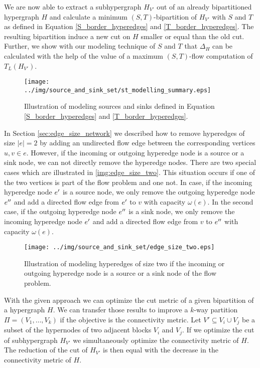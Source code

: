 We are now able to extract a subhypergraph $H_{V'}$ out of an already bipartitioned hypergraph $H$ and
calculate a minimum $(S,T)$-bipartition of $H_{V'}$ with $S$ and $T$ as defined
in Equation \ref{S_border_hyperedges} and \ref{T_border_hyperedges}. The resulting
bipartition induce a new cut on $H$ smaller or equal than the old cut. Further, we show with our
modeling technique of $S$ and $T$ that $\Delta_H$ can be calculated with the help of the value 
of a maximum $(S,T)$-flow computation of $T_L(H_{V'})$. \\
\begin{figure}[ht!]
\centering
\texttt{[image: ../img/source\_and\_sink\_set/st\_modelling\_summary.eps]}
\caption{Illustration of modeling sources and sinks defined in Equation \ref{S_border_hyperedges}
         and \ref{T_border_hyperedges}. }
\label{img:st_modelling_summary}
\end{figure}
In Section \ref{sec:edge_size_network} we described how to remove hyperedges of size $|e| = 2$ 
by adding an undirected flow edge between the corresponding vertices $u,v \in e$. However, if
the incoming or outgoing hyperedge node is a source or a sink node, we can not directly
remove the hyperedge nodes. There are two special cases which are illustrated
in \autoref{img:edge_size_two}. This situation occurs if one of the two vertices is part
of the flow problem and one not. In case, if the incoming hyperedge node $e'$ is a source node, 
we only remove the outgoing hyperedge node $e''$ and add a directed flow edge from $e'$ 
to $v$ with capacity $\omega(e)$. In the second case, if the outgoing hyperedge node $e''$ is
a sink node, we only remove the incoming hyperedge node $e'$ and add a directed flow edge from
$v$ to $e''$ with capacity $\omega(e)$.\\
\begin{figure}
\centering
\texttt{[image: ../img/source\_and\_sink\_set/edge\_size\_two.eps]}
\caption{Illustration of modeling hyperedges of size two if the incoming or outgoing
         hyperedge node is a source or a sink node of the flow problem.}
\label{img:edge_size_two}
\end{figure}
With the given approach we can optimize the cut metric of a given
bipartition of a hypergraph $H$. We can transfer those results to improve
a $k$-way partition $\Pi = (V_1,\ldots,V_k)$ if the objective is the connectivity
metric. Let $V' \subseteq V_i \cup V_j$ be a subset of the hypernodes of two adjacent
blocks $V_i$ and $V_j$. If we optimize the cut of
subhypergraph $H_{V'}$ we simultaneously optimize the connectivity metric of $H$.
The reduction of the cut of $H_{V'}$ is then equal with the decrease in
the connectivity metric of $H$.

